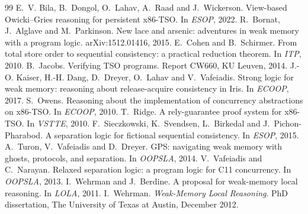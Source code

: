\documentclass[11pt]{article}
\begin{document}
\begin{thebibliography}{99}
E.~V. Bila, B.~Dongol, O.~Lahav, A.~Raad and J.~Wickerson.
\newblock View-based Owicki--Gries reasoning for persistent x86-TSO.
\newblock In \emph{ESOP}, 2022.
R.~Bornat, J.~Alglave and M.~Parkinson.
\newblock New lace and arsenic: adventures in weak memory with a program
  logic.
\newblock arXiv:1512.01416, 2015.
E.~Cohen and B.~Schirmer.
\newblock From total store order to sequential consistency: a practical
  reduction theorem.
\newblock In \emph{ITP}, 2010.
B.~Jacobs.
\newblock Verifying TSO programs.
\newblock Report CW660, KU Leuven, 2014.
J.-O. Kaiser, H.-H. Dang, D.~Dreyer, O.~Lahav and V.~Vafeiadis.
\newblock Strong logic for weak memory: reasoning about release-acquire
  consistency in Iris.
\newblock In \emph{ECOOP}, 2017.
S.~Owens.
\newblock Reasoning about the implementation of concurrency abstractions on
  x86-TSO.
\newblock In \emph{ECOOP}, 2010.
T.~Ridge.
\newblock A rely-guarantee proof system for x86-TSO.
\newblock In \emph{VSTTE}, 2010.
F.~Sieczkowski, K.~Svendsen, L.~Birkedal and J.~Pichon-Pharabod.
\newblock A separation logic for fictional sequential consistency.
\newblock In \emph{ESOP}, 2015.
A.~Turon, V.~Vafeiadis and D.~Dreyer.
\newblock GPS: navigating weak memory with ghosts, protocols, and
  separation.
\newblock In \emph{OOPSLA}, 2014.
V.~Vafeiadis and C.~Narayan.
\newblock Relaxed separation logic: a program logic for C11 concurrency.
\newblock In \emph{OOPSLA}, 2013.
I.~Wehrman and J.~Berdine.
\newblock A proposal for weak-memory local reasoning.
\newblock In \emph{LOLA}, 2011.
I.~Wehrman.
\newblock \emph{Weak-Memory Local Reasoning}.
\newblock PhD dissertation, The University of Texas at Austin, December 2012.
\end{thebibliography}

\appendix

\end{document}
